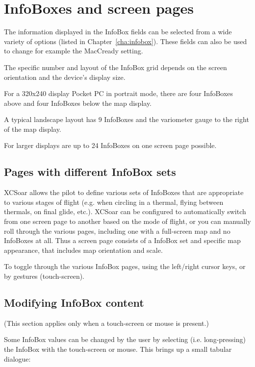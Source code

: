 \section{InfoBoxes and screen pages}

The information displayed in the InfoBox fields can be selected from a
wide variety of options (listed in Chapter~\ref{cha:infobox}). These
fields can also be used to change for example the MacCready setting.

The specific number and layout of the InfoBox grid depends on the
screen orientation and the device's display size.  

For a 320x240 display
Pocket PC in portrait mode, there are four InfoBoxes above and four
InfoBoxes below the map display.  

A typical landscape layout has 9 InfoBoxes and the variometer gauge 
to the right of the map display. 
 
For larger displays are up to 24 InfoBoxes on one screen page possible.


\subsection*{Pages with different InfoBox sets}

XCSoar allows the pilot to define various sets of InfoBoxes that are 
appropriate to various stages of flight (e.g. when circling in a thermal, 
flying between thermals, on final glide, etc.). XCSoar can be configured 
to automatically switch from one screen page to another based on the mode 
of flight, or you can manually roll through the various pages, including 
one with a full-screen map and no InfoBoxes at all. Thus a screen page 
consists of a InfoBox set and specific map appearance, that includes 
map orientation and scale.

To toggle through the various InfoBox pages, using the left/right cursor 
keys, or by gestures (touch-screen).


\subsection*{Modifying InfoBox content}

(This section applies only when a touch-screen or mouse is present.)

Some InfoBox values can be changed by the user by selecting (i.e. long-pressing) the
InfoBox with the touch-screen or mouse.  This brings up a small tabular dialogue:

